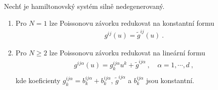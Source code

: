 \begin{theorem}
    Nechť je hamiltonovský systém silně nedegenerovaný.
    \begin{enumerate}
        \item Pro $N=1$ lze Poissonovu závorku redukovat na konstantní formu
        \begin{align}
            g^{ij}(u) = \tilde g^{ij}(u) \:.
        \end{align}

        \item Pro $N \geq 2$ lze Poissonovu závorku redukovat na lineární formu
        \begin{align}
            g^{ij \alpha}(u) = g^{ij \alpha}_k u^k + \tilde g^{ij \alpha} \:, \quad \alpha = 1, \cdots , d \:, \\
        \end{align}
        kde koeficienty $g^{ij \alpha}_k = b^{ij \alpha}_k + b^{ij \alpha}_k$, $\tilde g^{ij \alpha}$ a $b^{ij \alpha}_k$ jsou konstantní.
    \end{enumerate}
\end{theorem}
